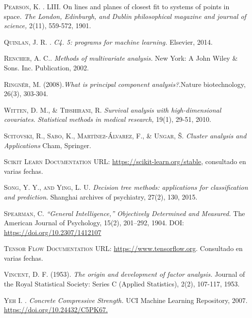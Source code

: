 \begin{thebibliography}{99}
 \textsc{Pearson, K. }. LIII. On lines and planes of closest fit to systems of points in space. \emph{The London, Edinburgh, and Dublin philosophical magazine and journal of science,} 2(11), 559-572, 1901.

\textsc{Quinlan, J. R. }. \emph{C4. 5: programs for machine learning.} Elsevier, 2014.

 \textsc{Rencher, A. C.}. \emph{Methods of multivariate analysis.} New York: A John Wiley \& Sons. Inc. Publication, 2002.


\textsc{Ringnér, M. (2008).}\emph{What is principal component analysis?}.Nature biotechnology, 26(3), 303-304.

\textsc{Witten, D. M., \& Tibshirani, R. } \emph{Survival analysis with high-dimensional covariates}. \emph{Statistical methods in medical research,} 19(1), 29-51, 2010.

\textsc{Scitovski, R., Sabo, K., Martínez-Álvarez, F., \& Ungar, Š. } \emph{Cluster analysis and Applications} Cham, Springer.

 \textsc{Scikit Learn Documentation} URL: \url{https://scikit-learn.org/stable}, consultado en varias fechas. 

\textsc{Song, Y. Y., and Ying, L. U. } \emph{Decision tree methods: applications for classification and prediction}. Shanghai archives of psychiatry, 27(2), 130, 2015.

\textsc{Spearman, C.} \emph{“General Intelligence,” Objectively Determined and Measured.} The American Journal of Psychology, 15(2), 201–292, 1904. DOI: \url{https://doi.org/10.2307/1412107}

\textsc{Tensor Flow Documentation} URL: \url{https://www.tensorflow.org}. Consultado en varias fechas.

\textsc{Vincent, D. F. (1953).} \emph{The origin and development of factor analysis.} Journal of the Royal Statistical Society: Series C (Applied Statistics), 2(2), 107-117, 1953.



\textsc{Yeh I. }. \emph{Concrete Compressive Strength.} UCI Machine Learning Repository, 2007. \url{https://doi.org/10.24432/C5PK67.}

\end{thebibliography}
 